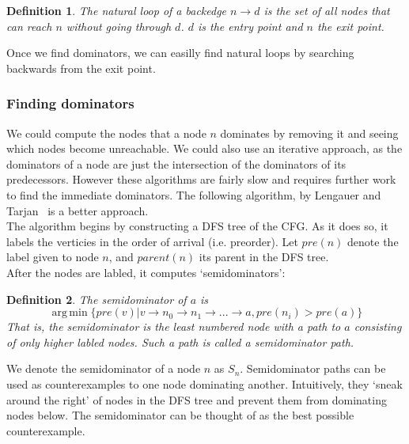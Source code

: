 \documentclass[12pt,a4paper]{article}
\DeclareMathOperator*{\argmin}{arg\,min}
\newtheorem{definition}{Definition}
\begin{document}
\begin{enumerate}
\begin{definition}\label{def:naturalloop}
The \emph{natural loop} of a backedge $n \to d$ is the set of all nodes that can reach $n$ without going through $d$. $d$ is the \emph{entry point} and $n$ the \emph{exit point}.
\end{definition}

Once we find dominators, we can easilly find natural loops by searching backwards from the exit point.

\subsubsection{Finding dominators}
We could compute the nodes that a node $n$ dominates by removing it and seeing which nodes become unreachable. We could also use an iterative approach, as the dominators of a node are  just the intersection of the dominators of its predecessors. However these algorithms are fairly slow and requires further work to find the immediate dominators.
The following algorithm, by Lengauer and Tarjan~\citep{lengtarj} is a better approach.\\
The algorithm begins by constructing a DFS tree of the CFG. As it does so, it labels the verticies in the order of arrival (i.e. preorder). Let $pre(n)$ denote the label given to node $n$, and $parent(n)$ its parent in the DFS tree.\\
After the nodes are labled, it computes `semidominators':

\begin{definition}\label{def:semidominator}
The \emph{semidominator} of $a$ is 
\[
\argmin\{pre(v) | v \to n_0 \to n_1 \to ... \to a, pre(n_i) > pre(a)\}
\]
That is, the semidominator is the least numbered node with a path to $a$
consisting of only higher labled nodes. Such a path is called a \emph{semidominator path}.
\end{definition}
We denote the semidominator of a node $n$ as $S_n$.
Semidominator paths can be used as counterexamples to one node dominating another. Intuitively, they `sneak around the right' of nodes in the DFS tree and prevent them from dominating nodes below. The semidominator can be thought of as the best possible counterexample.


\end{enumerate}
\end{document}
